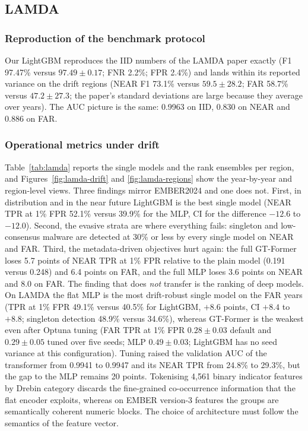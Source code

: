 \documentclass[fleqn,10pt]{wlscirep}
\newcommand{\gtf}{GT\mbox{-}Former}
\newcommand{\lgbm}{LightGBM}
\begin{document}
\subsection{LAMDA}
\label{sec:lamda}

\subsubsection{Reproduction of the benchmark protocol}
Our \lgbm{} reproduces the IID numbers of the LAMDA paper exactly (F1 97.47\% versus $97.49 \pm 0.17$; FNR 2.2\%; FPR 2.4\%) and lands within its reported variance on the drift regions (NEAR F1 73.1\% versus $59.5 \pm 28.2$; FAR 58.7\% versus $47.2 \pm 27.3$; the paper's standard deviations are large because they average over years). The AUC picture is the same: 0.9963 on IID, 0.830 on NEAR and 0.886 on FAR.

\subsubsection{Operational metrics under drift}
\label{sec:lamda-ops}
Table~\ref{tab:lamda} reports the single models and the rank ensembles per region, and Figures~\ref{fig:lamda-drift} and \ref{fig:lamda-regions} show the year-by-year and region-level views. Three findings mirror EMBER2024 and one does not. First, in distribution and in the near future \lgbm{} is the best single model (NEAR TPR at 1\% FPR 52.1\% versus 39.9\% for the MLP, CI for the difference $-12.6$ to $-12.0$). Second, the evasive strata are where everything fails: singleton and low-consensus malware are detected at 30\% or less by every single model on NEAR and FAR. Third, the metadata-driven objectives hurt again: the full \gtf{} loses 5.7 points of NEAR TPR at 1\% FPR relative to the plain model (0.191 versus 0.248) and 6.4 points on FAR, and the full MLP loses 3.6 points on NEAR and 8.0 on FAR. The finding that does \emph{not} transfer is the ranking of deep models. On LAMDA the flat MLP is the most drift-robust single model on the FAR years (TPR at 1\% FPR 49.1\% versus 40.5\% for \lgbm{}, $+8.6$ points, CI $+8.4$ to $+8.8$; singleton detection 48.9\% versus 34.6\%), whereas \gtf{} is the weakest even after Optuna tuning (FAR TPR at 1\% FPR $0.28 \pm 0.03$ default and $0.29 \pm 0.05$ tuned over five seeds; MLP $0.49 \pm 0.03$; \lgbm{} has no seed variance at this configuration). Tuning raised the validation AUC of the transformer from 0.9941 to 0.9947 and its NEAR TPR from 24.8\% to 29.3\%, but the gap to the MLP remains 20 points. Tokenising 4,561 binary indicator features by Drebin category discards the fine-grained co-occurrence information that the flat encoder exploits, whereas on EMBER version-3 features the groups are semantically coherent numeric blocks. The choice of architecture must follow the semantics of the feature vector.
\end{document}
